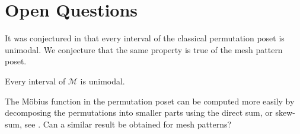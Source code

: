 \documentclass[11pt,a4paper,oneside]{article}
\begin{document}
\section{Open Questions}
It was conjectured in \cite{McSt13} that every interval of the classical permutation poset is unimodal.
 We conjecture that the same property is true of the mesh pattern poset.
\begin{conj}
Every interval of $\mathcal{M}$ is unimodal.
\end{conj}

The M\"obius function in the permutation poset can be computed more easily by decomposing the
permutations into smaller parts using the direct sum, or skew-sum, see \cite{BJJS11,McSt13}. Can a similar
result be obtained for mesh patterns?



\end{document}

